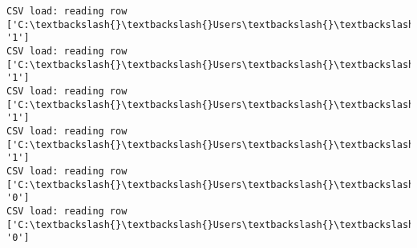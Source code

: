 \documentclass[11pt]{article}
\begin{document}
\begin{Verbatim}[commandchars=\\\{\}]
CSV load: reading row ['C:\textbackslash{}\textbackslash{}Users\textbackslash{}\textbackslash{}AbhishekGangadhar\textbackslash{}\textbackslash{}Downloads\textbackslash{}\textbackslash{}ActionRecog\textbackslash{}\textbackslash{}ActionRecog\textbackslash{}\textbackslash{}DataSets\textbackslash{}\textbackslash{}UCF11\textbackslash{}\textbackslash{}action\_youtube\_naudio\textbackslash{}\textbackslash{}golf\_swing\textbackslash{}\textbackslash{}v\_golf\_11\textbackslash{}\textbackslash{}v\_golf\_11\_04.avi', '1']
CSV load: reading row ['C:\textbackslash{}\textbackslash{}Users\textbackslash{}\textbackslash{}AbhishekGangadhar\textbackslash{}\textbackslash{}Downloads\textbackslash{}\textbackslash{}ActionRecog\textbackslash{}\textbackslash{}ActionRecog\textbackslash{}\textbackslash{}DataSets\textbackslash{}\textbackslash{}UCF11\textbackslash{}\textbackslash{}action\_youtube\_naudio\textbackslash{}\textbackslash{}golf\_swing\textbackslash{}\textbackslash{}v\_golf\_11\textbackslash{}\textbackslash{}v\_golf\_11\_05.avi', '1']
CSV load: reading row ['C:\textbackslash{}\textbackslash{}Users\textbackslash{}\textbackslash{}AbhishekGangadhar\textbackslash{}\textbackslash{}Downloads\textbackslash{}\textbackslash{}ActionRecog\textbackslash{}\textbackslash{}ActionRecog\textbackslash{}\textbackslash{}DataSets\textbackslash{}\textbackslash{}UCF11\textbackslash{}\textbackslash{}action\_youtube\_naudio\textbackslash{}\textbackslash{}golf\_swing\textbackslash{}\textbackslash{}v\_golf\_11\textbackslash{}\textbackslash{}v\_golf\_11\_06.avi', '1']
CSV load: reading row ['C:\textbackslash{}\textbackslash{}Users\textbackslash{}\textbackslash{}AbhishekGangadhar\textbackslash{}\textbackslash{}Downloads\textbackslash{}\textbackslash{}ActionRecog\textbackslash{}\textbackslash{}ActionRecog\textbackslash{}\textbackslash{}DataSets\textbackslash{}\textbackslash{}UCF11\textbackslash{}\textbackslash{}action\_youtube\_naudio\textbackslash{}\textbackslash{}golf\_swing\textbackslash{}\textbackslash{}v\_golf\_11\textbackslash{}\textbackslash{}v\_golf\_11\_07.avi', '1']
CSV load: reading row ['C:\textbackslash{}\textbackslash{}Users\textbackslash{}\textbackslash{}AbhishekGangadhar\textbackslash{}\textbackslash{}Downloads\textbackslash{}\textbackslash{}ActionRecog\textbackslash{}\textbackslash{}ActionRecog\textbackslash{}\textbackslash{}DataSets\textbackslash{}\textbackslash{}UCF11\textbackslash{}\textbackslash{}action\_youtube\_naudio\textbackslash{}\textbackslash{}biking\textbackslash{}\textbackslash{}v\_biking\_19\textbackslash{}\textbackslash{}v\_biking\_19\_01.avi', '0']
CSV load: reading row ['C:\textbackslash{}\textbackslash{}Users\textbackslash{}\textbackslash{}AbhishekGangadhar\textbackslash{}\textbackslash{}Downloads\textbackslash{}\textbackslash{}ActionRecog\textbackslash{}\textbackslash{}ActionRecog\textbackslash{}\textbackslash{}DataSets\textbackslash{}\textbackslash{}UCF11\textbackslash{}\textbackslash{}action\_youtube\_naudio\textbackslash{}\textbackslash{}biking\textbackslash{}\textbackslash{}v\_biking\_19\textbackslash{}\textbackslash{}v\_biking\_19\_02.avi', '0']

\end{Verbatim}
\end{document}
